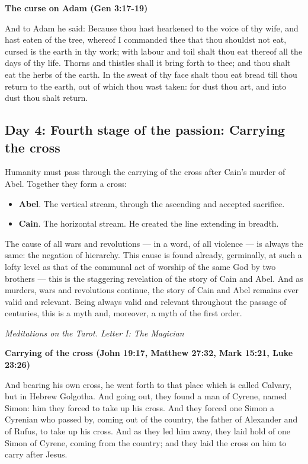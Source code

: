 \textbf{The curse on Adam (Gen 3:17-19)}

And to Adam he said: Because thou hast hearkened to the voice of thy wife, and hast eaten of the tree, whereof I
commanded thee that thou shouldst not eat, cursed is the earth in thy work; with labour and toil shalt thou eat thereof
all the days of thy life. Thorns and thistles shall it bring forth to thee; and thou shalt eat the herbs of the earth.
In the sweat of thy face shalt thou eat bread till thou return to the earth, out of which thou wast taken: for dust
thou art, and into dust thou shalt return.

\subsection*{Day 4: Fourth stage of the passion: Carrying the cross}
Humanity must pass through the carrying of the cross after Cain's murder of Abel. Together they
form a cross:

\begin{itemize}
\item \textbf{Abel}. The vertical stream, through the ascending and accepted sacrifice. 
\item \textbf{Cain}. The horizontal stream. He created the line extending in breadth. 
\end{itemize}

\begin{quotationx}
The cause of all wars and revolutions — in a word, of all violence — is always
the same: the negation of hierarchy. This cause is found already, germinally, at such a lofty level as that of the
communal act of worship of the same God by two brothers — this is the staggering revelation of the
story of Cain and Abel. And as murders, wars and revolutions continue, the story of Cain and Abel remains ever valid
and relevant. Being always valid and relevant throughout the passage of centuries, this is a myth and, moreover, a myth
of the first order. \begin{flushright} \textit{Meditations on the Tarot. Letter I: The Magician}\end{flushright}

\end{quotationx}

\textbf{Carrying of the cross (John 19:17, Matthew 27:32, Mark 15:21, Luke 23:26)}

And bearing his own cross, he went forth to that place which is called Calvary, but in Hebrew Golgotha. And going out,
they found a man of Cyrene, named Simon: him they forced to take up his cross. And they forced one Simon a Cyrenian who
passed by, coming out of the country, the father of Alexander and of Rufus, to take up his cross. And as they led him
away, they laid hold of one Simon of Cyrene, coming from the country; and they laid the cross on him to carry after
Jesus.

